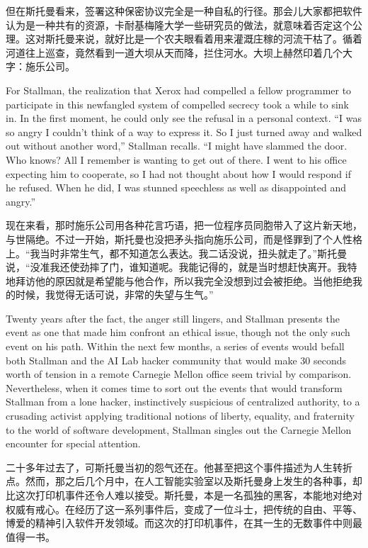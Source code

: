 \ifdefined\chs
但在斯托曼看来，签署这种保密协议完全是一种自私的行径。那会儿大家都把软件认为是一种共有的资源，卡耐基梅隆大学一些研究员的做法，就意味着否定这个公理。这对斯托曼来说，就好比是一个农夫眼看着用来灌溉庄稼的河流干枯了。循着河道往上巡查，竟然看到一道大坝从天而降，拦住河水。大坝上赫然印着几个大字：施乐公司。
\fi

\ifdefined\eng
For Stallman, the realization that Xerox had compelled a fellow programmer to participate in this newfangled system of compelled secrecy took a while to sink in. In the first moment, he could only see the refusal in a personal context. ``I was so angry I couldn't think of a way to express it. So I just turned away and walked out without another word,'' Stallman recalls. ``I might have slammed the door. Who knows? All I remember is wanting to get out of there. I went to his office expecting him to cooperate, so I had not thought about how I would respond if he refused.  When he did, I was stunned speechless as well as disappointed and angry.''
\fi

\ifdefined\chs
现在来看，那时施乐公司用各种花言巧语，把一位程序员同胞带入了这片新天地，与世隔绝。不过一开始，斯托曼也没把矛头指向施乐公司，而是怪罪到了个人性格上。“我当时非常生气，都不知道怎么表达。我二话没说，扭头就走了。”斯托曼说，“没准我还使劲摔了门，谁知道呢。我能记得的，就是当时想赶快离开。我特地拜访他的原因就是希望能与他合作，所以我完全没想到过会被拒绝。当他拒绝我的时候，我觉得无话可说，非常的失望与生气。”
\fi

\ifdefined\eng
Twenty years after the fact, the anger still lingers, and Stallman presents the event as one that made him confront an ethical issue, though not the only such event on his path. Within the next few months, a series of events would befall both Stallman and the AI Lab hacker community that would make 30 seconds worth of tension in a remote Carnegie Mellon office seem trivial by comparison. Nevertheless, when it comes time to sort out the events that would transform Stallman from a lone hacker, instinctively suspicious of centralized authority, to a crusading activist applying traditional notions of liberty, equality, and fraternity to the world of software development, Stallman singles out the Carnegie Mellon encounter for special attention.
\fi

\ifdefined\chs
二十多年过去了，可斯托曼当初的怨气还在。他甚至把这个事件描述为人生转折点。然而，那之后几个月中，在人工智能实验室以及斯托曼身上发生的各种事，却比这次打印机事件还令人难以接受。斯托曼，本是一名孤独的黑客，本能地对绝对权威有戒心。在经历了这一系列事件后，变成了一位斗士，把传统的自由、平等、博爱的精神引入软件开发领域。而这次的打印机事件，在其一生的无数事件中则最值得一书。
\fi

